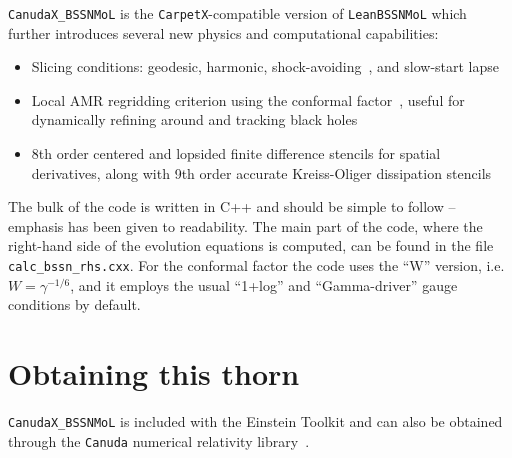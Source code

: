 \texttt{CanudaX\_BSSNMoL} is the \texttt{CarpetX}-compatible version of \texttt{LeanBSSNMoL} which further introduces several new physics and computational capabilities:
\begin{itemize}
  \item Slicing conditions: geodesic, harmonic, shock-avoiding~\cite{Baumgarte:2022ecu}, and slow-start lapse~\cite{Etienne:2024ncu}
  \item Local AMR regridding criterion using the conformal factor~\cite{Radia:2021smk}, useful for dynamically refining around and tracking black holes
  \item 8th order centered and lopsided finite difference stencils for spatial derivatives, along with 9th order accurate Kreiss-Oliger dissipation stencils
\end{itemize}

The bulk of the code is written in C++ and should be simple to follow -- emphasis has been given to readability. The main part of the code, where the right-hand side of the evolution equations is computed, can be found in the file \texttt{calc\_bssn\_rhs.cxx}.
%
For the conformal factor the code uses the ``W'' version, i.e.\ $W=\gamma^{-1/6}$, and it employs the usual ``1+log'' and ``Gamma-driver'' gauge conditions by default.


\section{Obtaining this thorn}

\texttt{CanudaX\_BSSNMoL} is included with the Einstein Toolkit and can also be obtained through the \texttt{Canuda} numerical relativity library~\cite{Canuda}.


